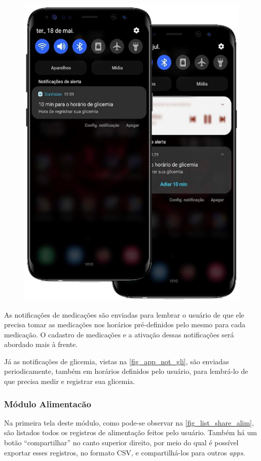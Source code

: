 \begin{figure}[htb]
\begin{minipage}{0.58\textwidth}
        \includegraphics[scale=0.59]{Imagens/desenvolvimento/app/app_not_gli.png}
    \end{minipage}
\end{figure}

As notificações de medicações são enviadas para lembrar o usuário de que ele precisa tomar as medicações
nos horários pré-definidos pelo mesmo para cada medicação. O cadastro de medicações e a ativação dessas
notificações será abordado mais à frente.

Já as notificações de glicemia, vistas na \autoref{fig_app_not_gli}, são enviadas periodicamente, também
em horários definidos pelo usuário, para lembrá-lo de que precisa medir e registrar sua glicemia.

\newpage

\subsubsection{Módulo Alimentacão}

Na primeira tela deste módulo, como pode-se observar na \autoref{fig_list_share_alim}, são listados todos
os registros de alimentação feitos pelo usuário. Também há um botão “compartilhar” no canto superior direito,
por meio do qual é possível exportar esses registros, no formato CSV, e compartilhá-los para outros \emph{apps}.


